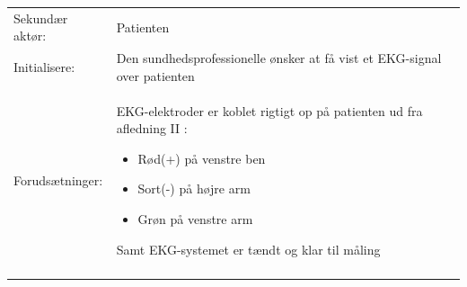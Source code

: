 \begin{table}[H]
\begin{tabularx}{\textwidth}{l X}
     Sekundær aktør:        &	Patienten                                                                                                                                                                                                                                                                                                                                                                                                                                                                                                                                                                                                                 \\ \addlinespace[1mm]  		                                                                                                                                                      
     Initialisere:          & 	Den sundhedsprofessionelle ønsker at få vist et EKG-signal over patienten
		 \\ \addlinespace[1mm]                                                                                                                                                                                                                                                                                                             
     Forudsætninger:        & 	EKG-elektroder er koblet rigtigt op på patienten ud fra afledning II :
     \begin{itemize}
     	\item Rød(+) på venstre ben
     	\item Sort(-) på højre arm
     	\item Grøn på venstre arm
     \end{itemize}
		Samt EKG-systemet er tændt og klar til måling                                                                                                                                                                                                                                                                                                                                                                                                                                                                                                                                                                           \\ \addlinespace[1mm]                                                                                                                                                       

\end{tabularx}
\end{table}
